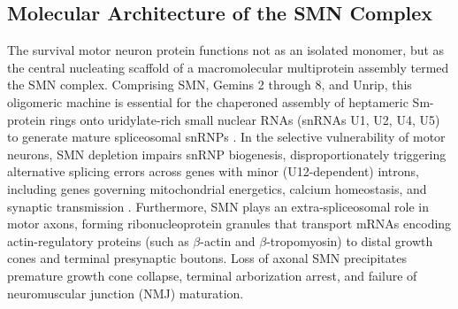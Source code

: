 \documentclass[journal]{IEEEtran}
\begin{document}
\subsection{Molecular Architecture of the SMN Complex}
The survival motor neuron protein functions not as an isolated monomer, but as the central nucleating scaffold of a macromolecular multiprotein assembly termed the SMN complex. Comprising SMN, Gemins 2 through 8, and Unrip, this oligomeric machine is essential for the chaperoned assembly of heptameric Sm-protein rings onto uridylate-rich small nuclear RNAs (snRNAs U1, U2, U4, U5) to generate mature spliceosomal snRNPs \cite{pellizzoni1998novel}. In the selective vulnerability of motor neurons, SMN depletion impairs snRNP biogenesis, disproportionately triggering alternative splicing errors across genes with minor (U12-dependent) introns, including genes governing mitochondrial energetics, calcium homeostasis, and synaptic transmission \cite{wirth2021spinal}. Furthermore, SMN plays an extra-spliceosomal role in motor axons, forming ribonucleoprotein granules that transport mRNAs encoding actin-regulatory proteins (such as $\beta$-actin and $\beta$-tropomyosin) to distal growth cones and terminal presynaptic boutons. Loss of axonal SMN precipitates premature growth cone collapse, terminal arborization arrest, and failure of neuromuscular junction (NMJ) maturation.
\end{document}
